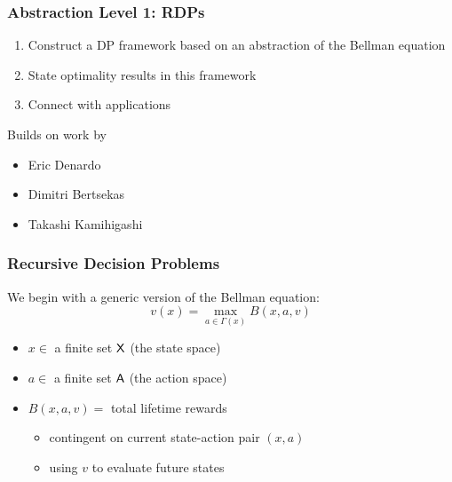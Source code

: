 \documentclass[dvipsnames]{beamer}
\begin{document}
\begin{frame}
    \frametitle{Abstraction Level 1:  RDPs}

    \begin{enumerate}
        \item Construct a DP framework based on an
            abstraction of the Bellman equation
            \vspace{0.5em}
        \item State optimality results in this framework
            \vspace{0.5em}
        \item Connect with applications
    \end{enumerate}

    \vspace{0.5em}
    \vspace{0.5em}
    Builds on work by 
    \begin{itemize}
        \item Eric Denardo 
        \vspace{0.5em}
        \item Dimitri Bertsekas 
        \vspace{0.5em}
        \item Takashi Kamihigashi
    \end{itemize}


\end{frame}



\begin{frame}
    \frametitle{Recursive Decision Problems}
    
    We begin with a generic version of the Bellman equation:
    \begin{equation*}
        v(x) = \max_{a \in \Gamma(x)} B(x, a, v)
    \end{equation*}

    \begin{itemize}
        \item $x \in $ a finite set $\mathsf X$ (the state space)
        \vspace{0.5em}
        \vspace{0.5em}
        \item $a \in $ a finite set $\mathsf A$ (the action space)
        \vspace{0.5em}
        \vspace{0.5em}
        \item $B(x, a, v) =$ total lifetime rewards
        \vspace{0.5em}
        \begin{itemize}
            \item contingent on current state-action pair $(x, a)$ 
            \vspace{0.5em}
            \item using  $v$ to evaluate future states
        \end{itemize}
    \end{itemize}


\end{frame}
\end{document}
